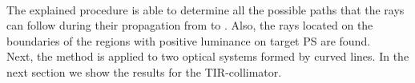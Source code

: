 \begin{algorithm}
\end{algorithm}
\\ \indent The explained procedure is able to determine all the possible paths that the rays can follow during their propagation from  to . Also, the rays located on the boundaries of the regions with positive luminance on target PS  are found.\\ \indent
Next, the method is applied to two optical systems formed by curved lines. In the next section we show the results for the TIR-collimator.
